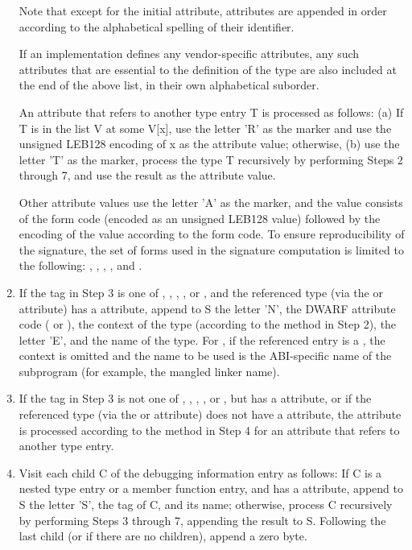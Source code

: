 \begin{enumerate}[1. ]
Note that except for the initial 
\DWATname{} attribute,
attributes are appended in order according to the alphabetical
spelling of their identifier.

If an implementation defines any vendor-specific attributes,
any such attributes that are essential to the definition of
the type are also included at the end of the above list,
in their own alphabetical suborder.

An attribute that refers to another type entry T is processed
as follows: (a) If T is in the list V at some V[x], use the
letter 'R' as the marker and use the unsigned LEB128
encoding of x as the attribute value; otherwise, (b) use the letter 'T'
as the marker, process the type T recursively by performing
Steps 2 through 7, and use the result as the attribute value.

Other attribute values use the letter 'A' as the marker, and
the value consists of the form code (encoded as an unsigned
LEB128 value) followed by the encoding of the value according
to the form code. To ensure reproducibility of the signature,
the set of forms used in the signature computation is limited
to the following: 
\DWFORMsdata, 
\DWFORMflag, 
\DWFORMstring,
\DWFORMexprloc,
and \DWFORMblock.

\item If the tag in Step 3 is one of \DWTAGpointertype,
\DWTAGreferencetype, 
\DWTAGrvaluereferencetype,
\DWTAGptrtomembertype, 
or \DWTAGfriend, and the referenced
type (via the \DWATtype{} or 
\DWATfriend{} attribute) has a
\DWATname{} attribute, append to S the letter 'N', the DWARF
attribute code (\DWATtype{} or 
\DWATfriend), the context of
the type (according to the method in Step 2), the letter 'E',
and the name of the type. For \DWTAGfriend, if the referenced
entry is a \DWTAGsubprogram, the context is omitted and the
name to be used is the ABI-specific name of the subprogram
(for example, the mangled linker name).


\item If the tag in Step 3 is not one of \DWTAGpointertype,
\DWTAGreferencetype, 
\DWTAGrvaluereferencetype,
\DWTAGptrtomembertype, or 
\DWTAGfriend, but has
a \DWATtype{} attribute, or if the referenced type (via
the \DWATtype{} or 
\DWATfriend{} attribute) does not have a
\DWATname{} attribute, the attribute is processed according to
the method in Step 4 for an attribute that refers to another
type entry.


\item Visit each child C of the debugging information
entry as follows: If C is a nested type entry or a member
function entry, and has 
a \DWATname{} attribute, append to
S the letter 'S', the tag of C, and its name; otherwise,
process C recursively by performing Steps 3 through 7,
appending the result to S. Following the last child (or if
there are no children), append a zero byte.
\end{enumerate}



